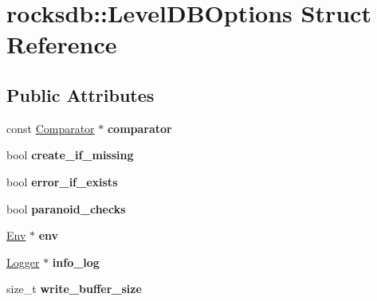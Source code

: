 \hypertarget{structrocksdb_1_1LevelDBOptions}{}\section{rocksdb\+:\+:Level\+D\+B\+Options Struct Reference}
\label{structrocksdb_1_1LevelDBOptions}
\subsection*{Public Attributes}
\begin{DoxyCompactItemize}
\item 
const \hyperlink{classrocksdb_1_1Comparator}{Comparator} $\ast$ {\bfseries comparator}\hypertarget{structrocksdb_1_1LevelDBOptions_ab3390627c2c3f9af0f9edddef698a555}{}\label{structrocksdb_1_1LevelDBOptions_ab3390627c2c3f9af0f9edddef698a555}

\item 
bool {\bfseries create\+\_\+if\+\_\+missing}\hypertarget{structrocksdb_1_1LevelDBOptions_a144bbb9a60d576073e674f26c41be7fa}{}\label{structrocksdb_1_1LevelDBOptions_a144bbb9a60d576073e674f26c41be7fa}

\item 
bool {\bfseries error\+\_\+if\+\_\+exists}\hypertarget{structrocksdb_1_1LevelDBOptions_a223d40836644e508965e0e991b8d95ca}{}\label{structrocksdb_1_1LevelDBOptions_a223d40836644e508965e0e991b8d95ca}

\item 
bool {\bfseries paranoid\+\_\+checks}\hypertarget{structrocksdb_1_1LevelDBOptions_a9e63a2c4d47896d1385559ba32200cad}{}\label{structrocksdb_1_1LevelDBOptions_a9e63a2c4d47896d1385559ba32200cad}

\item 
\hyperlink{classrocksdb_1_1Env}{Env} $\ast$ {\bfseries env}\hypertarget{structrocksdb_1_1LevelDBOptions_ab9822177833d9da4f88482835dcf19d2}{}\label{structrocksdb_1_1LevelDBOptions_ab9822177833d9da4f88482835dcf19d2}

\item 
\hyperlink{classrocksdb_1_1Logger}{Logger} $\ast$ {\bfseries info\+\_\+log}\hypertarget{structrocksdb_1_1LevelDBOptions_a56e3ee9faa9d2b2745cabcdcd9e242f7}{}\label{structrocksdb_1_1LevelDBOptions_a56e3ee9faa9d2b2745cabcdcd9e242f7}

\item 
size\+\_\+t {\bfseries write\+\_\+buffer\+\_\+size}\hypertarget{structrocksdb_1_1LevelDBOptions_a7691054488c72ecb34c734e861ea3a97}{}\label{structrocksdb_1_1LevelDBOptions_a7691054488c72ecb34c734e861ea3a97}


\end{DoxyCompactItemize}
